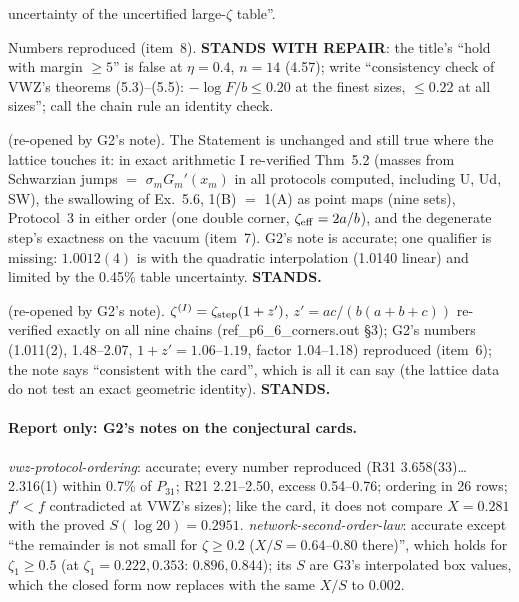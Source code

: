 \documentclass[11pt]{article}
\begin{document}
\begin{description}[leftmargin=1em,style=nextline]
 uncertainty of the uncertified large-$\zeta$ table''.
\item[lattice-vwz-bounds-equal-block-chains] Numbers reproduced (item~8). \textbf{STANDS WITH REPAIR}: the title's
 ``hold with margin $\ge5$'' is false at $\eta=0.4$, $n=14$ (4.57); write ``consistency check of VWZ's theorems
 (5.3)--(5.5): $-\log F/b\le0.20$ at the finest sizes, $\le0.22$ at all sizes''; call the chain rule an identity check.
\item[corner-calculus] (re-opened by G2's note). The Statement is unchanged and still true where the lattice
 touches it: in exact arithmetic I re-verified Thm~5.2 (masses from Schwarzian jumps $=$ $\sigma_mG_m'(x_m)$ in all
 protocols computed, including U, Ud, SW), the swallowing of Ex.~5.6, 1(B) $=$ 1(A) as point maps (nine sets),
 Protocol~3 in either order (one double corner, $\zeta_{\rm eff}=2a/b$), and the degenerate step's exactness on the
 vacuum (item~7). G2's note is accurate; one qualifier is missing: $1.0012(4)$ is with the quadratic interpolation
 (1.0140 linear) and limited by the 0.45\% table uncertainty. \textbf{STANDS.}
\item[frame-strength-amplification] (re-opened by G2's note). $\zeta^{(I)}=\zeta_{\rm step}(1+z')$,
 $z'=ac/(b(a+b+c))$ re-verified exactly on all nine chains (ref\_p6\_6\_corners.out \S3); G2's numbers (1.011(2),
 1.48--2.07, $1+z'=1.06$--$1.19$, factor 1.04--1.18) reproduced (item~6); the note says ``consistent with the
 card'', which is all it can say (the lattice data do not test an exact geometric identity). \textbf{STANDS.}
\end{description}

\paragraph{Report only: G2's notes on the conjectural cards.} \emph{vwz-protocol-ordering}: accurate; every number
reproduced (R31 3.658(33)\ldots2.316(1) within 0.7\% of $P_{31}$; R21 2.21--2.50, excess 0.54--0.76; ordering in
26 rows; $f'<f$ contradicted at VWZ's sizes); like the card, it does not compare $X=0.281$ with the proved
$S(\log20)=0.2951$. \emph{network-second-order-law}: accurate except ``the remainder is not small for $\zeta\ge0.2$
($X/S=0.64$--$0.80$ there)'', which holds for $\zeta_1\ge0.5$ (at $\zeta_1=0.222,0.353$: $0.896,0.844$); its $S$ are
G3's interpolated box values, which the closed form now replaces with the same $X/S$ to $0.002$.
\end{document}
